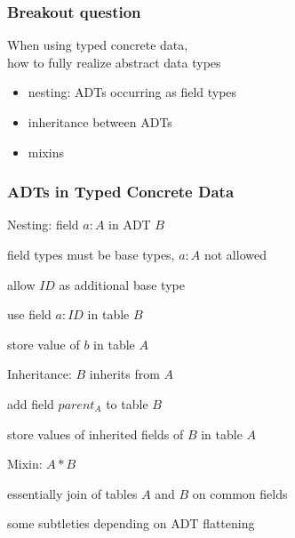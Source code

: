 \begin{frame}\frametitle{Breakout question}
When using typed concrete data,\\
how to fully realize abstract data types
\begin{itemize}
\item nesting: ADTs occurring as field types
\item inheritance between ADTs
\item mixins
\end{itemize}
\end{frame}

\begin{frame}\frametitle{ADTs in Typed Concrete Data}
\begin{blockitems}{Nesting: field $a:A$ in ADT $B$}
\item field types must be base types, $a:A$ not allowed
\item allow $ID$ as additional base type
\item use field $a:ID$ in table $B$
\item store value of $b$ in table $A$
\end{blockitems}

\begin{blockitems}{Inheritance: $B$ inherits from $A$}
\item add field $parent_A$ to table $B$
\item store values of inherited fields of $B$ in table $A$
\end{blockitems}

\begin{blockitems}{Mixin: $A*B$}
\item essentially join of tables $A$ and $B$ on common fields
\item some subtleties depending on ADT flattening
\end{blockitems}
\end{frame}

